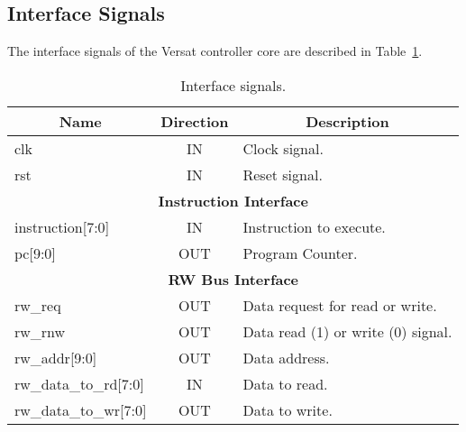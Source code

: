 \subsection{Interface Signals}
\label{sec:is}

The interface signals of the Versat controller core are described in Table~\ref{tab:is}.

\begin{table}[h]
\centering
\begin{tabular}{|l|c|l|}
\hline
\multicolumn{1}{|c|}{\bf Name} & {\bf Direction} & \multicolumn{1}{c|}{\bf Description}                                                     \\ \hline \hline
\multicolumn{1}{|l|}{clk}                                & IN              & Clock signal.                                                  \\ \hline
\multicolumn{1}{|l|}{rst}                                & IN              & \multicolumn{1}{l|}{Reset signal.}                             \\ \hline \hline
\multicolumn{3}{|c|}{{\bf Instruction Interface}}                                                                                           \\ \hline \hline
instruction{[}7:0{]}                                     & IN              & Instruction to execute.                                        \\ \hline
pc{[}9:0{]}                                              & OUT             & Program Counter.                                               \\ \hline \hline
\multicolumn{3}{|c|}{{\bf RW Bus Interface}}                                                                                                \\ \hline \hline
rw\_req                                                  & OUT             & Data request for read or write.                                \\ \hline
rw\_rnw                                                  & OUT             & Data read (1) or write (0) signal.                             \\ \hline
rw\_addr{[}9:0{]}                                        & OUT             & Data address.                                                  \\ \hline
rw\_data\_to\_rd{[}7:0{]}                                & IN              & Data to read.                                                  \\ \hline
rw\_data\_to\_wr{[}7:0{]}                                & OUT             & Data to write.                                                 \\ \hline
\end{tabular}
\caption{Interface signals.}
\label{tab:is}
\end{table}


